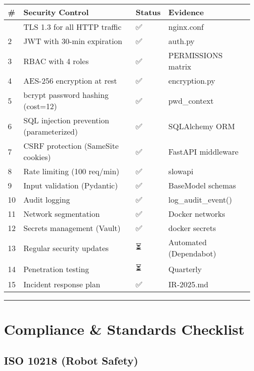 \documentclass[
]{article}
\begin{document}
\begin{longtable}[]{@{}llll@{}}
\toprule\noalign{}
\# & Security Control & Status & Evidence \\
\midrule\noalign{}
\endhead
\bottomrule\noalign{}
\endlastfoot
1 & TLS 1.3 for all HTTP traffic & ✅ & nginx.conf \\
2 & JWT with 30-min expiration & ✅ & auth.py \\
3 & RBAC with 4 roles & ✅ & PERMISSIONS matrix \\
4 & AES-256 encryption at rest & ✅ & encryption.py \\
5 & bcrypt password hashing (cost=12) & ✅ & pwd\_context \\
6 & SQL injection prevention (parameterized) & ✅ & SQLAlchemy ORM \\
7 & CSRF protection (SameSite cookies) & ✅ & FastAPI middleware \\
8 & Rate limiting (100 req/min) & ✅ & slowapi \\
9 & Input validation (Pydantic) & ✅ & BaseModel schemas \\
10 & Audit logging & ✅ & log\_audit\_event() \\
11 & Network segmentation & ✅ & Docker networks \\
12 & Secrets management (Vault) & ✅ & docker secrets \\
13 & Regular security updates & ⏳ & Automated (Dependabot) \\
14 & Penetration testing & ⏳ & Quarterly \\
15 & Incident response plan & ✅ & IR-2025.md \\
\end{longtable}

\begin{center}\rule{0.5\linewidth}{0.5pt}\end{center}

\hypertarget{compliance-standards-checklist}{%
\section{Compliance \& Standards
Checklist}\label{compliance-standards-checklist}}

\hypertarget{iso-10218-robot-safety}{%
\subsection{ISO 10218 (Robot Safety)}\label{iso-10218-robot-safety}}
\end{document}
